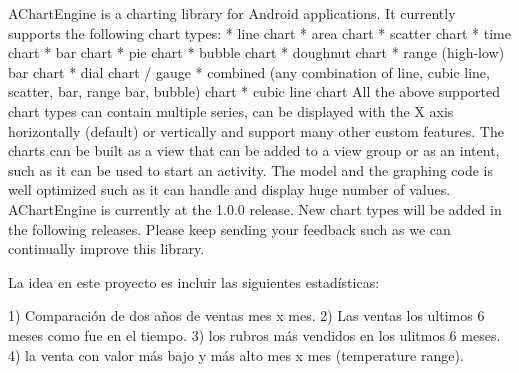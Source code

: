 AChartEngine is a charting library for Android applications. It currently supports the following chart types:
   * line chart
   * area chart
   * scatter chart
   * time chart
   * bar chart
   * pie chart
   * bubble chart
   * doughnut chart
   * range (high-low) bar chart
   * dial chart / gauge
   * combined (any combination of line, cubic line, scatter, bar, range bar, bubble) chart
   * cubic line chart
All the above supported chart types can contain multiple series, can be displayed with the X axis horizontally (default) or vertically and support many other custom features. The charts can be built as a view that can be added to a view group or as an intent, such as it can be used to start an activity.
The model and the graphing code is well optimized such as it can handle and display huge number of values.
AChartEngine is currently at the 1.0.0 release. New chart types will be added in the following releases. Please keep sending your feedback such as we can continually improve this library.

La idea en este proyecto es incluir las siguientes estadísticas:

1) Comparación de dos años de ventas mes x mes.
2) Las ventas los ultimos 6 meses como fue en el tiempo.
3) los rubros más vendidos en los ulitmos 6 meses.
4) la venta con valor más bajo y más alto mes x mes (temperature range).
